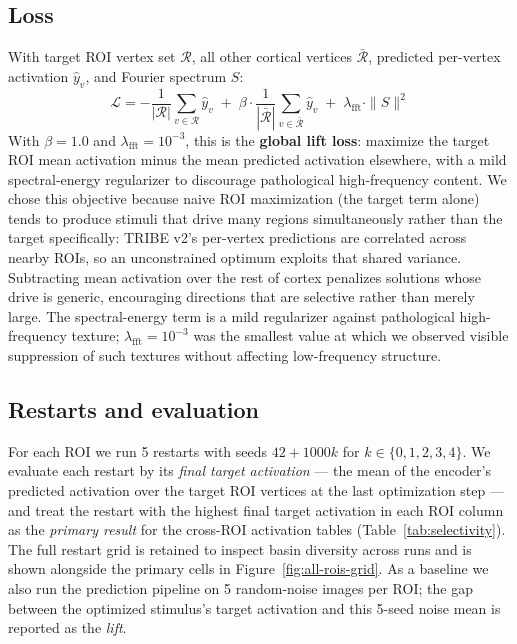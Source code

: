 \documentclass{article}
\begin{document}
\subsection{Loss}
With target ROI vertex set $\mathcal{R}$, all other cortical vertices $\bar{\mathcal{R}}$, predicted per-vertex activation $\hat{y}_v$, and Fourier spectrum $S$:
\begin{equation}
\mathcal{L} = -\frac{1}{|\mathcal{R}|}\sum_{v\in\mathcal{R}} \hat{y}_v \; + \; \beta \cdot \frac{1}{|\bar{\mathcal{R}}|}\sum_{v\in\bar{\mathcal{R}}} \hat{y}_v \; + \; \lambda_{\text{fft}} \cdot \|S\|^2
\end{equation}
With $\beta = 1.0$ and $\lambda_{\text{fft}} = 10^{-3}$, this is the \textbf{global lift loss}: maximize the target ROI mean activation minus the mean predicted activation elsewhere, with a mild spectral-energy regularizer to discourage pathological high-frequency content. We chose this objective because naive ROI maximization (the target term alone) tends to produce stimuli that drive many regions simultaneously rather than the target specifically: TRIBE v2's per-vertex predictions are correlated across nearby ROIs, so an unconstrained optimum exploits that shared variance. Subtracting mean activation over the rest of cortex penalizes solutions whose drive is generic, encouraging directions that are selective rather than merely large. The spectral-energy term is a mild regularizer against pathological high-frequency texture; $\lambda_{\text{fft}} = 10^{-3}$ was the smallest value at which we observed visible suppression of such textures without affecting low-frequency structure.

\subsection{Restarts and evaluation}
\label{sec:eval}
For each ROI we run 5 restarts with seeds $42 + 1000k$ for $k \in \{0,1,2,3,4\}$. We evaluate each restart by its \emph{final target activation} --- the mean of the encoder's predicted activation over the target ROI vertices at the last optimization step --- and treat the restart with the highest final target activation in each ROI column as the \emph{primary result} for the cross-ROI activation tables (Table~\ref{tab:selectivity}). The full restart grid is retained to inspect basin diversity across runs and is shown alongside the primary cells in Figure~\ref{fig:all-rois-grid}. As a baseline we also run the prediction pipeline on 5 random-noise images per ROI; the gap between the optimized stimulus's target activation and this 5-seed noise mean is reported as the \emph{lift}.
\end{document}
